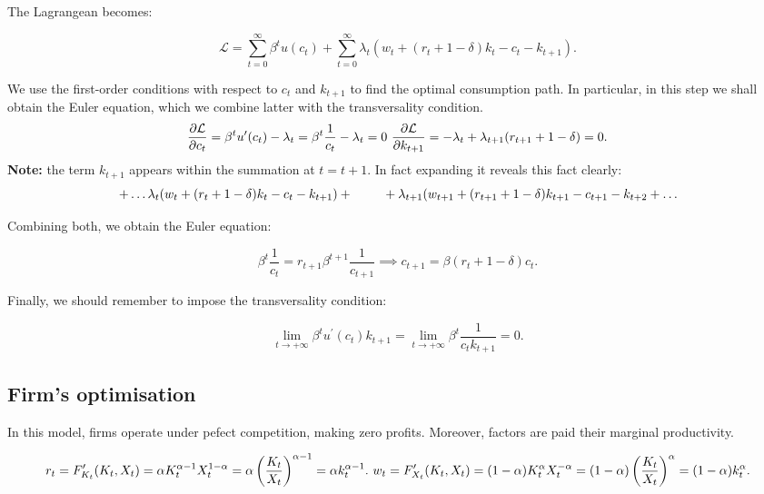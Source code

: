 \documentclass[11pt,a4paper,english]{article}
\begin{document}
The Lagrangean becomes:

\[ \mathcal{L} = \sum_{t=0}^{\infty} \beta^{t} u(c_{t}) + \sum_{t=0}^{\infty} \lambda_{t}(w_{t} + (r_{t} + 1 - \delta)k_{t} - c_{t} - k_{t+1}).\]

We use the first-order conditions with respect to \(c_{t}\) and
\(k_{t+1}\) to find the optimal consumption path. In particular, in this
step we shall obtain the Euler equation, which we combine latter with
the transversality condition.
\[ \frac{\partial \mathcal{L}}{\partial c_{t}} = \beta^{t} u^{\prime}(c_{t}) - \lambda_{t} = \beta^{t}\frac{1}{c_{t}} - \lambda_{t} = 0 \\\
   \frac{\partial \mathcal{L}}{\partial k_{t+1}} = -\lambda_{t} + \lambda_{t+1} (r_{t+1} + 1 - \delta) = 0.
\] \textbf{Note:} the term \(k_{t+1}\) appears within the summation at
\(t=t+1.\) In fact expanding it reveals this fact clearly:
\[ + \ldots \lambda_{t} (w_{t} + (r_{t} + 1 - \delta)k_{t} - c_{t} - k_{t+1}) + \\\
   \quad \quad + \lambda_{t+1}(w_{t+1} + (r_{t+1} + 1 - \delta)k_{t+1} - c_{t+1} - k_{t+2} + \ldots\]

Combining both, we obtain the Euler equation:

\[\beta^{t}\frac{1}{c_{t}} = r_{t+1} \beta^{t+1} \frac{1}{c_{t+1}} \implies c_{t+1} = \beta (r_{t} + 1 - \delta)c_{t}.\]

Finally, we should remember to impose the transversality condition:

\[\lim_{t \rightarrow +\infty} \beta^{t}u^{\prime}(c_{t})k_{t+1} = \lim_{t \rightarrow +\infty}\beta^{t}\frac{1}{c_{t}k_{t+1}} = 0.\]

\hypertarget{firms-optimisation}{%
\subsection{Firm's optimisation}\label{firms-optimisation}}

In this model, firms operate under pefect competition, making zero
profits. Moreover, factors are paid their marginal productivity.

\[r_{t} = F^{\prime}_{K_{t}}(K_{t}, X_{t}) = \alpha K_{t}^{\alpha - 1}X_{t}^{1-\alpha} = \alpha \left(\frac{K_{t}}{X_{t}}\right)^{\alpha - 1} = \alpha k_{t}^{\alpha -1}. \\\
  w_{t} = F^{\prime}_{X_{t}}(K_{t}, X_{t}) = (1-\alpha) K_{t}^{\alpha} X_{t}^{-\alpha} = (1-\alpha)\left(\frac{K_{t}}{X_{t}}\right)^{\alpha} = (1-\alpha) k_{t}^{\alpha}.\]
\end{document}
